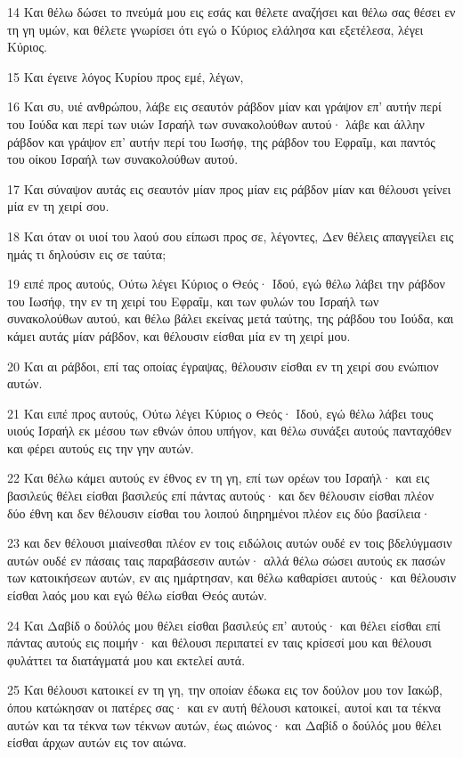 \par 14 Και θέλω δώσει το πνεύμά μου εις εσάς και θέλετε αναζήσει και θέλω σας θέσει εν τη γη υμών, και θέλετε γνωρίσει ότι εγώ ο Κύριος ελάλησα και εξετέλεσα, λέγει Κύριος.
\par 15 Και έγεινε λόγος Κυρίου προς εμέ, λέγων,
\par 16 Και συ, υιέ ανθρώπου, λάβε εις σεαυτόν ράβδον μίαν και γράψον επ' αυτήν περί του Ιούδα και περί των υιών Ισραήλ των συνακολούθων αυτού· λάβε και άλλην ράβδον και γράψον επ' αυτήν περί του Ιωσήφ, της ράβδον του Εφραΐμ, και παντός του οίκου Ισραήλ των συνακολούθων αυτού.
\par 17 Και σύναψον αυτάς εις σεαυτόν μίαν προς μίαν εις ράβδον μίαν και θέλουσι γείνει μία εν τη χειρί σου.
\par 18 Και όταν οι υιοί του λαού σου είπωσι προς σε, λέγοντες, Δεν θέλεις απαγγείλει εις ημάς τι δηλούσιν εις σε ταύτα;
\par 19 ειπέ προς αυτούς, Ούτω λέγει Κύριος ο Θεός· Ιδού, εγώ θέλω λάβει την ράβδον του Ιωσήφ, την εν τη χειρί του Εφραΐμ, και των φυλών του Ισραήλ των συνακολούθων αυτού, και θέλω βάλει εκείνας μετά ταύτης, της ράβδου του Ιούδα, και κάμει αυτάς μίαν ράβδον, και θέλουσιν είσθαι μία εν τη χειρί μου.
\par 20 Και αι ράβδοι, επί τας οποίας έγραψας, θέλουσιν είσθαι εν τη χειρί σου ενώπιον αυτών.
\par 21 Και ειπέ προς αυτούς, Ούτω λέγει Κύριος ο Θεός· Ιδού, εγώ θέλω λάβει τους υιούς Ισραήλ εκ μέσου των εθνών όπου υπήγον, και θέλω συνάξει αυτούς πανταχόθεν και φέρει αυτούς εις την γην αυτών.
\par 22 Και θέλω κάμει αυτούς εν έθνος εν τη γη, επί των ορέων του Ισραήλ· και εις βασιλεύς θέλει είσθαι βασιλεύς επί πάντας αυτούς· και δεν θέλουσιν είσθαι πλέον δύο έθνη και δεν θέλουσιν είσθαι του λοιπού διηρημένοι πλέον εις δύο βασίλεια·
\par 23 και δεν θέλουσι μιαίνεσθαι πλέον εν τοις ειδώλοις αυτών ουδέ εν τοις βδελύγμασιν αυτών ουδέ εν πάσαις ταις παραβάσεσιν αυτών· αλλά θέλω σώσει αυτούς εκ πασών των κατοικήσεων αυτών, εν αις ημάρτησαν, και θέλω καθαρίσει αυτούς· και θέλουσιν είσθαι λαός μου και εγώ θέλω είσθαι Θεός αυτών.
\par 24 Και Δαβίδ ο δούλός μου θέλει είσθαι βασιλεύς επ' αυτούς· και θέλει είσθαι επί πάντας αυτούς εις ποιμήν· και θέλουσι περιπατεί εν ταις κρίσεσί μου και θέλουσι φυλάττει τα διατάγματά μου και εκτελεί αυτά.
\par 25 Και θέλουσι κατοικεί εν τη γη, την οποίαν έδωκα εις τον δούλον μου τον Ιακώβ, όπου κατώκησαν οι πατέρες σας· και εν αυτή θέλουσι κατοικεί, αυτοί και τα τέκνα αυτών και τα τέκνα των τέκνων αυτών, έως αιώνος· και Δαβίδ ο δούλός μου θέλει είσθαι άρχων αυτών εις τον αιώνα.
